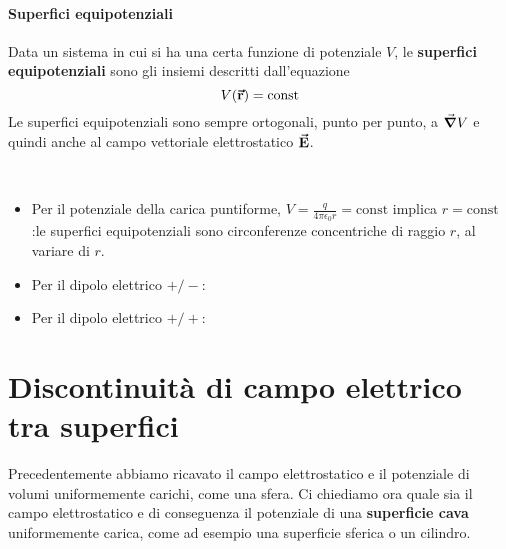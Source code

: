 \paragraph{Superfici equipotenziali}
\begin{define}
	Data un sistema in cui si ha una certa funzione di potenziale $V$, le \textbf{superfici equipotenziali} sono gli insiemi descritti dall'equazione
	\begin{equation}
		V(\vb*{\va{r}})=\textrm{const}
	\end{equation}
	Le superfici equipotenziali sono sempre ortogonali, punto per punto, a $\grad{V}$ e quindi anche al campo vettoriale elettrostatico $\vb*{\va{E}}$.
\end{define}
\begin{examples}~{}
	\begin{itemize}
		\item Per il potenziale della carica puntiforme, $V=\frac{q}{4\pi\epsilon_0r}=\mathrm{const}$ implica $r=\mathrm{const}$:le superfici equipotenziali sono circonferenze concentriche di raggio $r$, al variare di $r$.
		\item Per il dipolo elettrico $+/-$:
		\item Per il dipolo elettrico $+/+$:
	\end{itemize}
\end{examples}
\section{Discontinuità di campo elettrico tra superfici}
Precedentemente abbiamo ricavato il campo elettrostatico e il potenziale di volumi uniformemente carichi, come una sfera. Ci chiediamo ora quale sia il campo elettrostatico e di conseguenza il potenziale di una \textbf{superficie cava} uniformemente carica, come ad esempio una superficie sferica o un cilindro.
